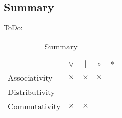 \subsection{Summary}
ToDo:
\begin{table}[h]
  \centering
  \begin{tabular}{|l|c|c|c|c|}
    \hline
    & $\vee$ & $|$ & $\circ$ & $*$ \\
    \hline
    \hline
    Associativity & $\times$ & $\times$ & $\times$ & \\
    \hline
    Distributivity & & & & \\
    \hline
    Commutativity & $\times$ & $\times$ & & \\
    \hline
  \end{tabular}
  \caption{Summary}
\end{table}

\lipsum[7]